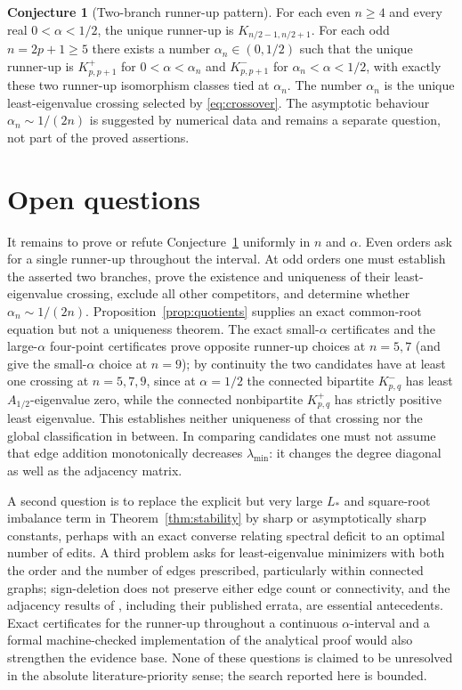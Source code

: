 \documentclass[11pt]{amsart}
\theoremstyle{definition}
\newtheorem{conjecture}[theorem]{Conjecture}
\newcommand{\lam}{\lambda_{\min}}
\begin{document}
\begin{conjecture}[Two-branch runner-up pattern]\label{conj:second}
For each even $n\ge4$ and every real $0<\alpha<1/2$, the unique runner-up is $K_{n/2-1,n/2+1}$. For each odd $n=2p+1\ge5$ there exists a number $\alpha_n\in(0,1/2)$ such that the unique runner-up is $K_{p,p+1}^{+}$ for $0<\alpha<\alpha_n$ and $K_{p,p+1}^{-}$ for $\alpha_n<\alpha<1/2$, with exactly these two runner-up isomorphism classes tied at $\alpha_n$. The number $\alpha_n$ is the unique least-eigenvalue crossing selected by \eqref{eq:crossover}. The asymptotic behaviour $\alpha_n\sim1/(2n)$ is suggested by numerical data and remains a separate question, not part of the proved assertions.
\end{conjecture}

\section{Open questions}
It remains to prove or refute Conjecture~\ref{conj:second} uniformly in $n$ and $\alpha$. Even orders ask for a single runner-up throughout the interval. At odd orders one must establish the asserted two branches, prove the existence and uniqueness of their least-eigenvalue crossing, exclude all other competitors, and determine whether $\alpha_n\sim1/(2n)$. Proposition~\ref{prop:quotients} supplies an exact common-root equation but not a uniqueness theorem. The exact small-$\alpha$ certificates and the large-$\alpha$ four-point certificates prove opposite runner-up choices at $n=5,7$ (and give the small-$\alpha$ choice at $n=9$); by continuity the two candidates have at least one crossing at $n=5,7,9$, since at $\alpha=1/2$ the connected bipartite $K_{p,q}^{-}$ has least $A_{1/2}$-eigenvalue zero, while the connected nonbipartite $K_{p,q}^{+}$ has strictly positive least eigenvalue. This establishes neither uniqueness of that crossing nor the global classification in between. In comparing candidates one must not assume that edge addition monotonically decreases $\lam$: it changes the degree diagonal as well as the adjacency matrix.

A second question is to replace the explicit but very large $L_*$ and square-root imbalance term in Theorem~\ref{thm:stability} by sharp or asymptotically sharp constants, perhaps with an exact converse relating spectral deficit to an optimal number of edits. A third problem asks for least-eigenvalue minimizers with both the order and the number of edges prescribed, particularly within connected graphs; sign-deletion does not preserve either edge count or connectivity, and the adjacency results of \cite{BellEtAlI,BellEtAlII}, including their published errata, are essential antecedents. Exact certificates for the runner-up throughout a continuous $\alpha$-interval and a formal machine-checked implementation of the analytical proof would also strengthen the evidence base. None of these questions is claimed to be unresolved in the absolute literature-priority sense; the search reported here is bounded.
\end{document}
